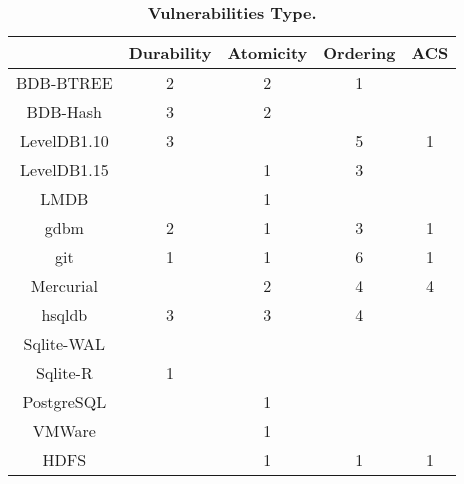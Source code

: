 \setlength{\tempa}{\tabcolsep}
\setlength{\tabcolsep}{2pt}
\begin{table}[t]
\centering
{\footnotesize
\begin{tabular}{c|cccc}
 & \textbf{Durability} & \textbf{Atomicity} & \textbf{Ordering} & \textbf{ACS} \\ \hline
BDB-BTREE & 2 & 2 & 1 &  \\ \hline
BDB-Hash & 3 & 2 &  &  \\ \hline
LevelDB1.10 & 3 &  & 5 & 1 \\ \hline
LevelDB1.15 &  & 1 & 3 &  \\ \hline
LMDB &  & 1 &  &  \\ \hline
gdbm & 2 & 1 & 3 & 1 \\ \hline
git & 1 & 1 & 6 & 1 \\ \hline
Mercurial &  & 2 & 4 & 4 \\ \hline
hsqldb & 3 & 3 & 4 &  \\ \hline
Sqlite-WAL &  &  &  &  \\ \hline
Sqlite-R & 1 &  &  &  \\ \hline
PostgreSQL & & 1 & & \\ \hline
VMWare &  & 1 &  &  \\ \hline
HDFS &  & 1 & 1 & 1 \\
\end{tabular}
}
\vspace{-0.1in}
\caption{\textbf{Vulnerabilities Type.}}
\label{tbl-vul-category}
\vspace{-0.2in}
\end{table}
\setlength{\tabcolsep}{\tempa}

